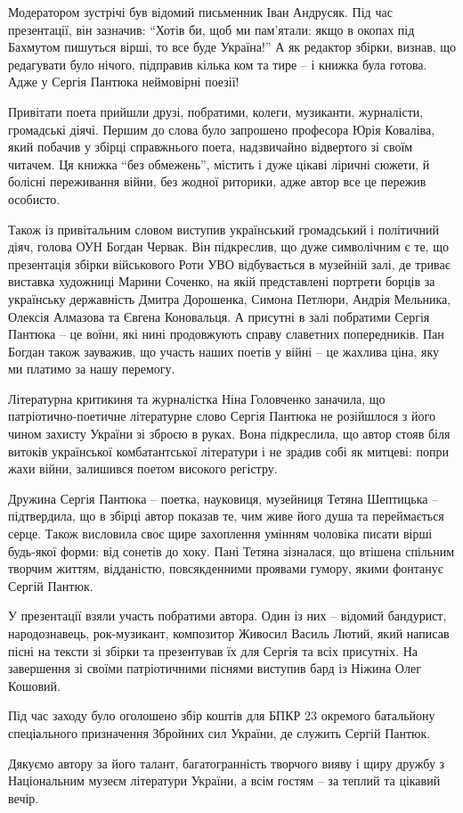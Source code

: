 Модератором зустрічі був відомий письменник Іван Андрусяк. Під час презентації,
він зазначив: \enquote{Хотів би, щоб ми пам'ятали: якщо в окопах під Бахмутом пишуться
вірші, то все буде Україна!} А як редактор збірки, визнав, що редагувати було
нічого, підправив кілька ком та тире – і книжка була готова. Адже у Сергія
Пантюка неймовірні поезії! 

Привітати поета прийшли друзі, побратими, колеги, музиканти, журналісти,
громадські діячі. Першим до слова було запрошено професора Юрія Коваліва, який
побачив у збірці справжнього поета, надзвичайно відвертого зі своїм читачем. Ця
книжка \enquote{без обмежень}, містить і дуже цікаві ліричні сюжети, й болісні
переживання війни, без жодної риторики, адже автор все це пережив особисто. 

Також із привітальним словом виступив український громадський і політичний
діяч, голова ОУН Богдан Червак. Він підкреслив, що дуже символічним є те, що
презентація збірки військового Роти УВО відбувається в музейній залі, де триває
виставка художниці Марини Соченко, на якій представлені портрети борців за
українську державність Дмитра Дорошенка, Симона Петлюри, Андрія Мельника,
Олексія Алмазова та Євгена Коновальця. А присутні в залі побратими Сергія
Пантюка – це воїни, які нині продовжують справу славетних попередників. Пан
Богдан також зауважив, що участь наших поетів у війні – це жахлива ціна, яку ми
платимо за нашу перемогу.

Літературна критикиня та журналістка Ніна Головченко заначила, що
патріотично-поетичне літературне слово Сергія Пантюка не розійшлося з його
чином захисту України зі зброєю в руках. Вона підкреслила, що автор стояв біля
витоків української комбатантської літератури і не зрадив собі як митцеві:
попри жахи війни, залишився поетом високого регістру. 

Дружина Сергія Пантюка – поетка, науковиця, музейниця Тетяна Шептицька –
підтвердила, що в збірці автор показав те, чим живе його душа та переймається
серце. Також висловила своє щире захоплення умінням чоловіка писати вірші
будь-якої форми: від сонетів до хоку. Пані Тетяна зізналася, що втішена
спільним творчим життям, відданістю, повсякденними проявами гумору, якими
фонтанує Сергій Пантюк. 

У презентації взяли участь побратими автора. Один із них – відомий бандурист,
народознавець, рок-музикант, композитор Живосил Василь Лютий, який написав
пісні на тексти зі збірки та презентував їх для Сергія та всіх присутніх. На
завершення зі своїми патріотичними піснями виступив бард із Ніжина Олег
Кошовий. 

Під час заходу було оголошено збір коштів для БПКР 23 окремого батальйону
спеціального призначення Збройних сил України, де служить Сергій Пантюк.

Дякуємо автору за його талант, багатогранність творчого вияву і щиру дружбу з
Національним музеєм літератури України, а всім гостям – за теплий та цікавий
вечір.
